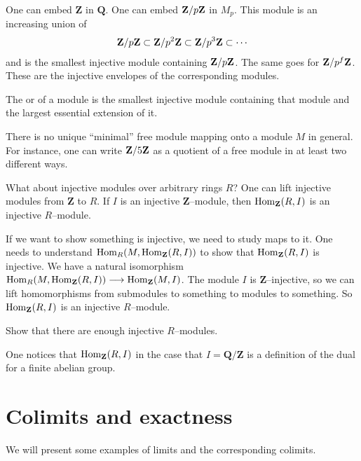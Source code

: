 \documentclass[11pt, oneside,margin=1in]{article}
\begin{document}
\begin{example}\label{}
One can embed $\mathbf{Z}$ in $\mathbf{Q}$. One can embed $\mathbf Z / p\mathbf Z$ in $M_p$. This module is an increasing union of
 \begin{align*}
	\mathbf Z / p\mathbf Z \subset \mathbf Z / p^2\mathbf Z \subset \mathbf Z / p^3\mathbf Z \subset \cdots
\end{align*}
and is the smallest injective module containing $\mathbf Z / p\mathbf Z$. The same goes for $\mathbf Z / p^f\mathbf Z$. These are the injective envelopes of the corresponding modules.
\end{example}

\begin{definition}[ ]\label{}
The  or  of a module is the smallest injective module containing that module and the largest essential extension of it.
\end{definition}

There is no unique ``minimal'' free module mapping onto a module $M$ in general. For instance, one can write $\mathbf Z / 5\mathbf Z$ as a quotient of a free module in at least two different ways. 

What about injective modules over arbitrary rings $R$? One can lift injective modules from $\mathbf{Z}$ to $R$. If $I$ is an injective $\mathbf{Z}$--module, then $\operatorname{Hom}_{\mathbf{Z}}(R, I)$ is an injective $R$--module. 

If we want to show something is injective, we need to study maps to it. One needs to understand $ \operatorname{Hom}_{R}(M, \operatorname{Hom}_{\mathbf{Z}}(R, I))$ to show that $\operatorname{Hom}_{\mathbf{Z}}(R, I)$ is injective. We have a natural isomorphism $\operatorname{Hom}_{R}(M, \operatorname{Hom}_{\mathbf{Z}}(R, I)) \longrightarrow \operatorname{Hom}_{\mathbf{Z}}(M, I)$. The module $I$ is $\mathbf{Z}$--injective, so we can lift homomorphisms from submodules to something  to modules to something. So $\operatorname{Hom}_{\mathbf{Z}}(R, I)$ is an injective $R$--module.
\begin{exercise}\label{}
Show that there are enough injective $R$--modules.
\end{exercise}
One notices that $\operatorname{Hom}_{\mathbf{Z}}(R, I)$ in the case that $I=\mathbf{Q}/\mathbf{Z}$ is a definition of the dual for a finite abelian group. 

\section{Colimits and exactness}
We will present some examples of limits and the corresponding colimits.
\end{document}
